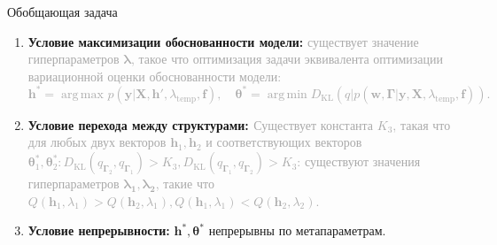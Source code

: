 \documentclass[usenames,dvipsnames,11pt,pdf,utf8,russian,aspectratio=43]{beamer}
\DeclareMathOperator*{\argmin}{arg\,min}
\DeclareMathOperator*{\argmax}{arg\,max}
\begin{document}
\begin{frame}{Обобщающая задача}
\begin{enumerate}
\item \textbf{Условие максимизации обоснованности модели: }\textcolor{darkgray}{ существует значение гиперпараметров $\boldsymbol{\lambda}$, такое что оптимизация задачи эквивалента оптимизации вариационной оценки обоснованности модели:
\vspace{-0.2cm}
\[
    \mathbf{h}^{*} = \argmax_{} p(\mathbf{y}|\mathbf{X}, \mathbf{h}', \lambda_{\text{temp}}, \mathbf{f}),\quad
    \boldsymbol{\theta}^{*} = \argmin D_\text{KL}(q| p(\mathbf{w}, \boldsymbol{\Gamma}|\mathbf{y}, \mathbf{X}, \lambda_{\text{temp}}, \mathbf{f})).
\]}
\vspace{-0.6cm}
\item \textbf{Условие \textcolor{OliveGreen}{перехода между структурами: }}
\textcolor{darkgray}{
Существует константа $K_3$, такая что для любых двух векторов $\mathbf{h}_{1}, \mathbf{h}_2$ и соответствующих векторов $\boldsymbol{\theta}_1^{*},\boldsymbol{\theta}_2^{*}: D_\text{KL}(q_{\boldsymbol{\Gamma}_2}, q_{\boldsymbol{\Gamma}_1})>K_3, D_\text{KL}(q_{\boldsymbol{\Gamma}_1}, q_{\boldsymbol{\Gamma}_2})>K_3$:  существуют значения гиперпараметров $\boldsymbol{\lambda_1},\boldsymbol{\lambda_2}$, такие что  $Q(\mathbf{h}_1, \lambda_1) > Q(\mathbf{h}_2, \lambda_1), Q(\mathbf{h}_1, \lambda_1) < Q(\mathbf{h}_2, \lambda_2)$.
}
\item \textbf{Условие непрерывности: } $\mathbf{h}^{*}, \boldsymbol{\theta}^{*}$ непрерывны по метапараметрам.

\end{enumerate}
\end{frame}
\end{document}
